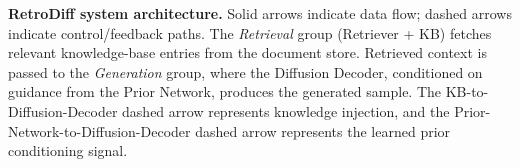 \caption{\textbf{RetroDiff system architecture.} Solid arrows indicate data flow; dashed arrows indicate control/feedback paths. The \emph{Retrieval} group (Retriever + KB) fetches relevant knowledge-base entries from the document store. Retrieved context is passed to the \emph{Generation} group, where the Diffusion Decoder, conditioned on guidance from the Prior Network, produces the generated sample. The KB-to-Diffusion-Decoder dashed arrow represents knowledge injection, and the Prior-Network-to-Diffusion-Decoder dashed arrow represents the learned prior conditioning signal.}
